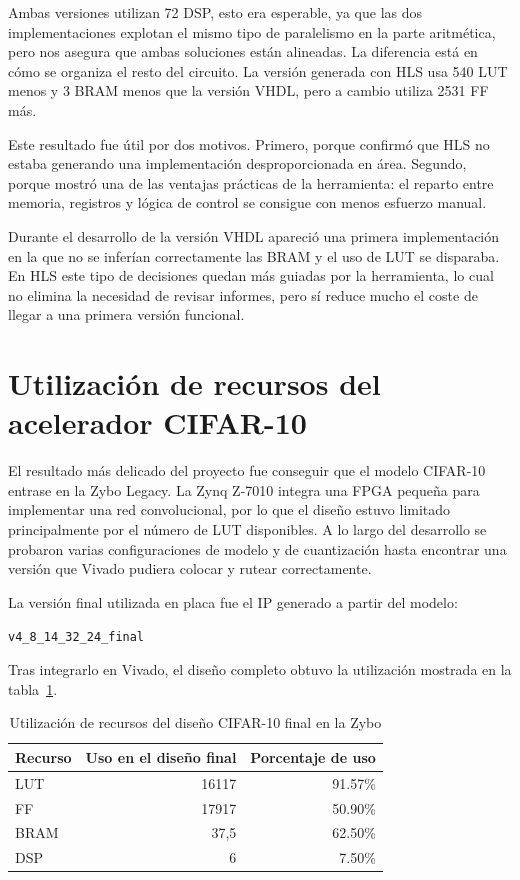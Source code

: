 Ambas versiones utilizan 72 \ac{DSP}, esto era esperable, ya que las dos
implementaciones explotan el mismo tipo de paralelismo en la parte aritmética, pero nos asegura
que ambas soluciones están alineadas. La diferencia está
en cómo se organiza el resto del circuito. La versión generada con \ac{HLS} usa 540
\ac{LUT} menos y 3 \ac{BRAM}
menos que la versión \ac{VHDL}, pero a cambio utiliza 2531 \ac{FF} más.

Este resultado fue útil por dos motivos. Primero, porque confirmó que \ac{HLS} no estaba
generando una
implementación desproporcionada en área. Segundo, porque mostró una de las ventajas prácticas de la
herramienta: el reparto entre memoria, registros y lógica de control se consigue con menos esfuerzo
manual.

Durante el desarrollo de la versión \ac{VHDL} apareció una primera implementación en la que no
se inferían correctamente las \ac{BRAM} y el uso de \ac{LUT} se disparaba. En \ac{HLS}
este tipo de decisiones
quedan más guiadas por la herramienta, lo cual no elimina la necesidad de revisar informes, pero sí
reduce mucho el coste de llegar a una primera versión funcional.

\section{Utilización de recursos del acelerador CIFAR-10}

El resultado más delicado del proyecto fue conseguir que el modelo \ac{CIFAR}-10 entrase en la Zybo
Legacy. La Zynq Z-7010 integra una \ac{FPGA} pequeña para implementar una red
convolucional, por lo que el
diseño estuvo limitado principalmente por el número de \ac{LUT} disponibles. A lo largo
del desarrollo
se probaron varias configuraciones de modelo y de cuantización hasta encontrar una versión que
Vivado pudiera colocar y rutear correctamente.

La versión final utilizada en placa fue el \ac{IP} generado a partir del modelo:

\texttt{v4\_8\_14\_32\_24\_final}

Tras integrarlo en Vivado, el diseño completo obtuvo la
utilización mostrada en la tabla~\ref{tab:recursosCifar10Final}.

\begin{table}[h!]
  \centering
  \begin{tabular}{|l|r|r|}
    \hline
    \textbf{Recurso} & \textbf{Uso en el diseño final} & \textbf{Porcentaje de uso} \\ \hline
    \ac{LUT} &   16117 & 91.57\% \\ \hline
    \ac{FF} &    17917 & 50.90\% \\ \hline
    \ac{BRAM} &  37,5  & 62.50\% \\ \hline
    \ac{DSP} &   6     & 7.50\%  \\ \hline
  \end{tabular}
  \caption{Utilización de recursos del diseño CIFAR-10 final en la Zybo}
  \label{tab:recursosCifar10Final}
\end{table}

